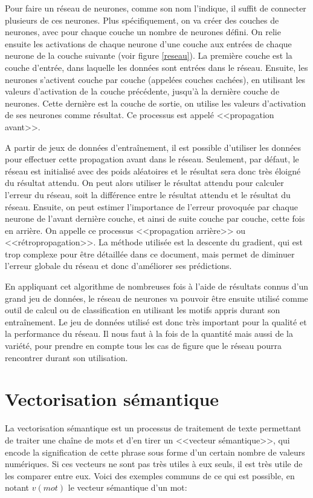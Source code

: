 \documentclass[openany, 11pt]{memoir}
\begin{document}
\bigskip
Pour faire un réseau de neurones, comme son nom l'indique, il suffit de connecter plusieurs de ces neurones. Plus spécifiquement, on va créer des couches de neurones, avec pour chaque couche un nombre de neurones défini. On relie ensuite les activations de chaque neurone d'une couche aux entrées de chaque neurone de la couche suivante (voir figure \ref{reseau}). La première couche est la couche d'entrée, dans laquelle les données sont entrées dans le réseau. Ensuite, les neurones s'activent couche par couche (appelées couches cachées), en utilisant les valeurs d'activation de la couche précédente, jusqu'à la dernière couche de neurones. Cette dernière est la couche de sortie, on utilise les valeurs d'activation de ses neurones comme résultat. Ce processus est appelé <<propagation avant>>.

\bigskip
A partir de jeux de données d'entraînement, il est possible d'utiliser les données pour effectuer cette propagation avant dans le réseau. Seulement, par défaut, le réseau est initialisé avec des poids aléatoires et le résultat sera donc très éloigné du résultat attendu. On peut alors utiliser le résultat attendu pour calculer l'erreur du réseau, soit la différence entre le résultat attendu et le résultat du réseau. Ensuite, on peut estimer l'importance de l'erreur provoquée par chaque neurone de l'avant dernière couche, et ainsi de suite couche par couche, cette fois en arrière. On appelle ce processus <<propagation arrière>> ou <<rétropropagation>>. La méthode utilisée est la descente du gradient, qui est trop complexe pour être détaillée dans ce document, mais permet de diminuer l'erreur globale du réseau et donc d'améliorer ses prédictions.

En appliquant cet algorithme de nombreuses fois à l'aide de résultats connus d'un grand jeu de données, le réseau de neurones va pouvoir être ensuite utilisé comme outil de calcul ou de classification en utilisant les motifs appris durant son entraînement. Le jeu de données utilisé est donc très important pour la qualité et la performance du réseau. Il nous faut à la fois de la quantité mais aussi de la variété, pour prendre en compte tous les cas de figure que le réseau pourra rencontrer durant son utilisation.

\section{Vectorisation sémantique}
\label{vectorisationsemantique}

La vectorisation sémantique est un processus de traitement de texte permettant de traiter une chaîne de mots et d'en tirer un <<vecteur sémantique>>, qui encode la signification de cette phrase sous forme d'un certain nombre de valeurs numériques. Si ces vecteurs ne sont pas très utiles à eux seuls, il est très utile de les comparer entre eux. Voici des exemples communs de ce qui est possible, en notant $v(mot)$ le vecteur sémantique d'un mot:
\end{document}

